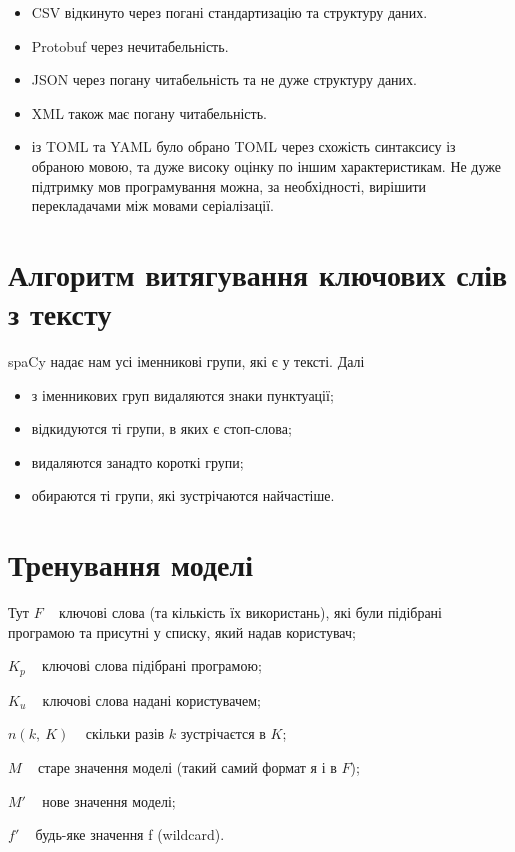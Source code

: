 \documentclass{article}
\let\oldsection\section
\renewcommand{\section}{\clearpage\oldsection}
\begin{document}
\hrulefill

\begin{itemize}
	\item CSV відкинуто через погані стандартизацію та структуру даних.
	\item Protobuf через нечитабельність.
	\item JSON через погану читабельність та не дуже структуру даних.
	\item XML також має погану читабельність.
	\item із TOML та YAML було обрано TOML через схожість синтаксису із обраною мовою,
	та дуже високу оцінку по іншим характеристикам.
	Не дуже підтримку мов програмування можна, за необхідності,
	вирішити перекладачами між мовами серіалізації.
\end{itemize}

\section{Алгоритм витягування ключових слів з тексту}
	spaCy надає нам усі іменникові групи, які є у тексті. Далі
\begin{itemize}
  \item з іменникових груп видаляются знаки пунктуації;
  \item відкидуются ті групи, в яких є стоп-слова;
  \item видаляются занадто короткі групи;
  \item обираются ті групи, які зустрічаются найчастіше.
\end{itemize}


\section{Тренування моделі}

Тут $F$ \textemdash~ ключові слова (та кількість їх використань),
      які були підібрані програмою та присутні у списку, який надав користувач;

  $K_p$ \textemdash~ ключові слова підібрані програмою;

  $K_u$ \textemdash~ ключові слова надані користувачем;

  $n(k,~ K)$ \textemdash~ скільки разів $k$ зустрічаєтся в $K$;

  $M$ \textemdash~ старе значення моделі (такий самий формат я і в $F$);

  $M'$ \textemdash~ нове значення моделі;

  $f'$ \textemdash~ будь-яке значення f (wildcard).
\end{document}
